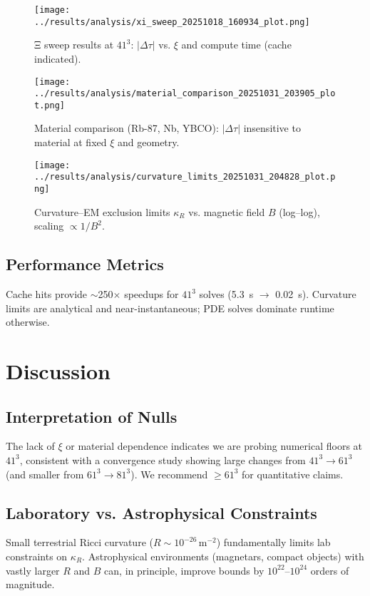 \documentclass[10pt,twocolumn]{article}
\begin{document}
\begin{figure}[t]
  \centering
  \texttt{[image: ../results/analysis/xi\_sweep\_20251018\_160934\_plot.png]}
  \caption{Ξ sweep results at $41^3$: $|\Delta\tau|$ vs. $\xi$ and compute time (cache indicated).}
  \label{fig:xi_sweep}
\end{figure}

\begin{figure}[t]
  \centering
  \texttt{[image: ../results/analysis/material\_comparison\_20251031\_203905\_plot.png]}
  \caption{Material comparison (Rb-87, Nb, YBCO): $|\Delta\tau|$ insensitive to material at fixed $\xi$ and geometry.}
  \label{fig:materials}
\end{figure}

\begin{figure}[t]
  \centering
  \texttt{[image: ../results/analysis/curvature\_limits\_20251031\_204828\_plot.png]}
  \caption{Curvature--EM exclusion limits $\kappa_R$ vs. magnetic field $B$ (log--log), scaling $\propto 1/B^2$.}
  \label{fig:kappa_vs_B}
\end{figure}

\subsection{Performance Metrics}
Cache hits provide $\sim$250$\times$ speedups for $41^3$ solves (5.3~s $\rightarrow$ 0.02~s). Curvature limits are analytical and near-instantaneous; PDE solves dominate runtime otherwise.

\section{Discussion}
\subsection{Interpretation of Nulls}
The lack of $\xi$ or material dependence indicates we are probing numerical floors at $41^3$, consistent with a convergence study showing large changes from $41^3\to61^3$ (and smaller from $61^3\to81^3$). We recommend $\ge 61^3$ for quantitative claims.

\subsection{Laboratory vs. Astrophysical Constraints}
Small terrestrial Ricci curvature ($R\sim10^{-26}\,\mathrm{m^{-2}}$) fundamentally limits lab constraints on $\kappa_R$. Astrophysical environments (magnetars, compact objects) with vastly larger $R$ and $B$ can, in principle, improve bounds by $10^{22}$--$10^{24}$ orders of magnitude.
\end{document}
